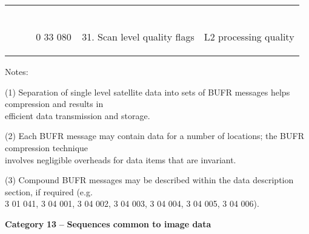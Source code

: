 \begin{longtable}[]{@{}llll@{}}
\begin{minipage}[t]{0.22\columnwidth}
\begin{enumerate}
\end{enumerate}\strut
\end{minipage} & \begin{minipage}[t]{0.22\columnwidth}\raggedright
\strut
\end{minipage}\tabularnewline
\begin{minipage}[t]{0.22\columnwidth}\raggedright
\strut
\end{minipage} & \begin{minipage}[t]{0.22\columnwidth}\raggedright
0 33 080\strut
\end{minipage} & \begin{minipage}[t]{0.22\columnwidth}\raggedright
\begin{enumerate}
\setcounter{enumi}{30}
\item
  Scan level quality flags
\end{enumerate}\strut
\end{minipage} & \begin{minipage}[t]{0.22\columnwidth}\raggedright
L2 processing quality\strut
\end{minipage}\tabularnewline
\bottomrule
\end{longtable}

Notes:

(1) Separation of single level satellite data into sets of BUFR messages helps compression and results in~\\
efficient data transmission and storage.

(2) Each BUFR message may contain data for a number of locations; the BUFR compression technique~\\
involves negligible overheads for data items that are invariant.

(3) Compound BUFR messages may be described within the data description section, if required (e.g.~\\
3 01 041, 3 04 001, 3 04 002, 3 04 003, 3 04 004, 3 04 005, 3 04 006).

\textbf{Category} \textbf{13} \textbf{--} \textbf{Sequences common to image data}

